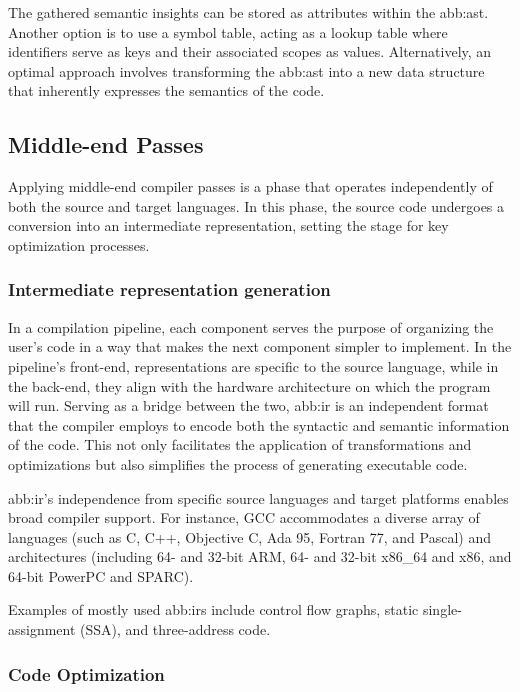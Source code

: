             The gathered semantic insights can be stored as attributes within the \gls{abb:ast}. Another option is to use a symbol table, acting as a lookup table where identifiers serve as keys and their associated scopes as values. Alternatively, an optimal approach involves transforming the \gls{abb:ast} into a new data structure that inherently expresses the semantics of the code.

            

    \subsection{Middle-end Passes}
        Applying middle-end compiler passes is a phase that operates independently of both the source and target languages. In this phase, the source code undergoes a conversion into an intermediate representation, setting the stage for key optimization processes. 

        \subsubsection{Intermediate representation generation}

            In a compilation pipeline, each component serves the purpose of organizing the user's code in a way that makes the next component simpler to implement. In the pipeline's front-end, representations are specific to the source language, while in the back-end, they align with the hardware architecture on which the program will run. Serving as a bridge between the two, \gls{abb:ir} is an independent format that the compiler employs to encode both the syntactic and semantic information of the code. This not only facilitates the application of transformations and optimizations but also simplifies the process of generating executable code.

            \gls{abb:ir}'s independence from specific source languages and target platforms enables broad compiler support. For instance, GCC accommodates a diverse array of languages (such as C, C++, Objective C, Ada 95, Fortran 77, and Pascal) and architectures (including 64- and 32-bit ARM, 64- and 32-bit x86\_64 and x86, and 64-bit PowerPC and SPARC).

            Examples of mostly used \gls{abb:ir}s include control flow graphs, static single-assignment (SSA), and three-address code.

        \subsubsection{Code Optimization}

